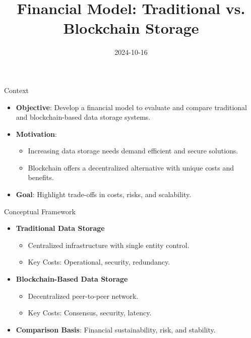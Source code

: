 \documentclass[aspectratio=169]{beamer}
\title{Financial Model: Traditional vs. Blockchain Storage}
\date{2024-10-16}
\begin{document}
	
	\begin{frame}
		\titlepage
	\end{frame}
	
	\begin{frame}{Context}
		\begin{itemize}
        \item \textbf{Objective}: Develop a financial model to evaluate and compare traditional and blockchain-based data storage systems.
        \item \textbf{Motivation}:
        \begin{itemize}
            \item Increasing data storage needs demand efficient and secure solutions.
            \item Blockchain offers a decentralized alternative with unique costs and benefits.
        \end{itemize}
        \item \textbf{Goal}: Highlight trade-offs in costs, risks, and scalability.
    \end{itemize}
        
	\end{frame}
 
	\begin{frame}{Conceptual Framework}
    \begin{itemize}
        \item \textbf{Traditional Data Storage}
        \begin{itemize}
            \item Centralized infrastructure with single entity control.
            \item Key Costs: Operational, security, redundancy.
        \end{itemize}
        \item \textbf{Blockchain-Based Data Storage}
        \begin{itemize}
            \item Decentralized peer-to-peer network.
            \item Key Costs: Consensus, security, latency.
        \end{itemize}
        \item \textbf{Comparison Basis}: Financial sustainability, risk, and stability.
    \end{itemize}
    \end{frame}
 
\end{document}

